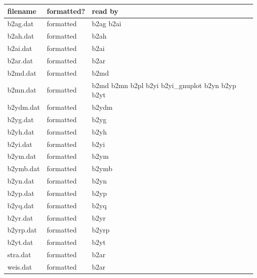 \documentclass[a4paper,10pt]{report}
\begin{document}
\begin{table}[hbtp]
  \leavevmode
  \begin{center}
\begin{tabular}{l|l|l}
filename & formatted? & read by \\ \hline
b2ag.dat \index{b2ag.dat} & formatted &  b2ag b2ai \\
b2ah.dat \index{b2ah.dat} & formatted &  b2ah \\
b2ai.dat \index{b2ai.dat} & formatted &  b2ai \\
b2ar.dat \index{b2ar.dat} & formatted &  b2ar \\
b2md.dat \index{b2md.dat} & formatted &  b2md \\
b2mn.dat \index{b2mn.dat} & formatted &  b2md b2mn b2pl b2yi b2yi\_gnuplot b2yn b2yp b2yt \\
b2ydm.dat \index{b2ydm.dat} & formatted &  b2ydm \\
b2yg.dat \index{b2yg.dat} & formatted &  b2yg \\
b2yh.dat \index{b2yh.dat} & formatted &  b2yh \\
b2yi.dat \index{b2yi.dat} & formatted &  b2yi \\
b2ym.dat \index{b2ym.dat} & formatted &  b2ym \\
b2ymb.dat \index{b2ymb.dat} & formatted &  b2ymb \\
b2yn.dat \index{b2yn.dat} & formatted &  b2yn \\
b2yp.dat \index{b2yp.dat} & formatted &  b2yp \\
b2yq.dat \index{b2yq.dat} & formatted &  b2yq \\
b2yr.dat \index{b2yr.dat} & formatted &  b2yr \\
b2yrp.dat \index{b2yrp.dat} & formatted &  b2yrp \\
b2yt.dat \index{b2yt.dat} & formatted &  b2yt \\
stra.dat \index{stra.dat} & formatted &  b2ar \\
weis.dat \index{weis.dat} & formatted &  b2ar \\
\end{tabular}
  \end{center}
\end{table}
\end{document}
